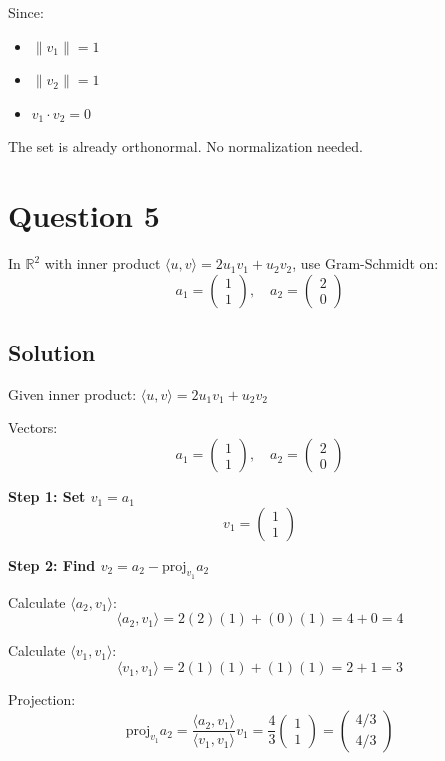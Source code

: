 \documentclass[12pt]{article}
\begin{document}
Since:
\begin{itemize}
\item $\|v_1\| = 1$
\item $\|v_2\| = 1$
\item $v_1 \cdot v_2 = 0$
\end{itemize}

The set is already orthonormal. No normalization needed.

\section*{Question 5}
In $\mathbb{R}^2$ with inner product $\langle u, v \rangle = 2u_1v_1 + u_2v_2$, use Gram-Schmidt on:
\[
a_1 = \begin{pmatrix} 1 \\ 1 \end{pmatrix}, \quad a_2 = \begin{pmatrix} 2 \\ 0 \end{pmatrix}
\]

\subsection*{Solution}

Given inner product: $\langle u, v \rangle = 2u_1v_1 + u_2v_2$

Vectors:
\[
a_1 = \begin{pmatrix} 1 \\ 1 \end{pmatrix}, \quad a_2 = \begin{pmatrix} 2 \\ 0 \end{pmatrix}
\]

\textbf{Step 1: Set $v_1 = a_1$}
\[
v_1 = \begin{pmatrix} 1 \\ 1 \end{pmatrix}
\]

\textbf{Step 2: Find $v_2 = a_2 - \text{proj}_{v_1} a_2$}

Calculate $\langle a_2, v_1 \rangle$:
\[
\langle a_2, v_1 \rangle = 2(2)(1) + (0)(1) = 4 + 0 = 4
\]

Calculate $\langle v_1, v_1 \rangle$:
\[
\langle v_1, v_1 \rangle = 2(1)(1) + (1)(1) = 2 + 1 = 3
\]

Projection:
\[
\text{proj}_{v_1} a_2 = \frac{\langle a_2, v_1 \rangle}{\langle v_1, v_1 \rangle} v_1 = \frac{4}{3} \begin{pmatrix} 1 \\ 1 \end{pmatrix} = \begin{pmatrix} 4/3 \\ 4/3 \end{pmatrix}
\]
\end{document}
